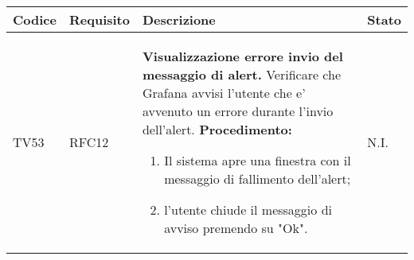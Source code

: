 \begin{table}[!htpb]
	\centering
	\renewcommand{\arraystretch}{2} 
	\begin{tabular}{|l|l|p{10cm}|l|}
		\rowcolor{orange!50}
		\hline
		\textbf{Codice} & \textbf{Requisito}& \textbf{Descrizione} & \textbf{Stato}\\ 
		\hline
		TV53 & RFC12 &
			\textbf{Visualizzazione errore invio del messaggio di alert.}
			\newline
			Verificare che Grafana avvisi l’utente che e’ avvenuto un errore durante l’invio dell’alert.
			\newline
			\textbf{Procedimento:}
			\begin{enumerate}
				\item Il sistema apre una finestra con il messaggio di fallimento dell'alert;
				\item l'utente chiude il messaggio di avviso premendo su "Ok".
			\end{enumerate} 
			& N.I.\\
		\hline
	\end{tabular}
\end{table}